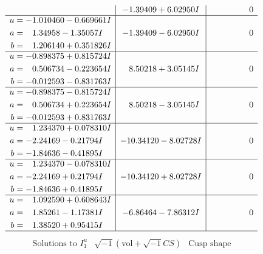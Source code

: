 \documentclass[1p]{elsarticle_modified}
\theoremstyle{definition}
\newcommand{\I}{\sqrt{-1}}
\begin{document}
$$\begin{array}{c|c|c}
 & -1.39409 + 6.02950 I & \phantom{-0.000000 } 0 \\ \hline\begin{aligned}
u &= -1.010460 - 0.669661 I \\
a &= \phantom{-}1.34958 - 1.35057 I \\
b &= \phantom{-}1.206140 + 0.351826 I\end{aligned}
 & -1.39409 - 6.02950 I & \phantom{-0.000000 } 0 \\ \hline\begin{aligned}
u &= -0.898375 + 0.815724 I \\
a &= \phantom{-}0.506734 - 0.223654 I \\
b &= -0.012593 - 0.831763 I\end{aligned}
 & \phantom{-}8.50218 + 3.05145 I & \phantom{-0.000000 } 0 \\ \hline\begin{aligned}
u &= -0.898375 - 0.815724 I \\
a &= \phantom{-}0.506734 + 0.223654 I \\
b &= -0.012593 + 0.831763 I\end{aligned}
 & \phantom{-}8.50218 - 3.05145 I & \phantom{-0.000000 } 0 \\ \hline\begin{aligned}
u &= \phantom{-}1.234370 + 0.078310 I \\
a &= -2.24169 - 0.21794 I \\
b &= -1.84636 - 0.41895 I\end{aligned}
 & -10.34120 - 8.02728 I & \phantom{-0.000000 } 0 \\ \hline\begin{aligned}
u &= \phantom{-}1.234370 - 0.078310 I \\
a &= -2.24169 + 0.21794 I \\
b &= -1.84636 + 0.41895 I\end{aligned}
 & -10.34120 + 8.02728 I & \phantom{-0.000000 } 0 \\ \hline\begin{aligned}
u &= \phantom{-}1.092590 + 0.608643 I \\
a &= \phantom{-}1.85261 - 1.17381 I \\
b &= \phantom{-}1.38520 + 0.95415 I\end{aligned}
 & -6.86464 - 7.86312 I & \phantom{-0.000000 } 0\\
 \hline 
 \end{array}$$\newpage$$\begin{array}{c|c|c}  
\text{Solutions to }I^u_{1}& \I (\text{vol} + \sqrt{-1}CS) & \text{Cusp shape}\\

\end{array}$$
\end{document}
